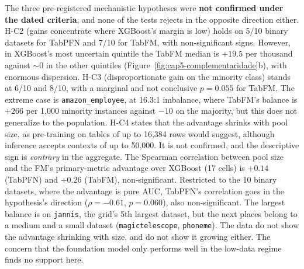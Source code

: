 The three pre-registered mechanistic hypotheses were \textbf{not
confirmed under the
dated criteria}, and none of the tests rejects in the opposite direction
either. H-C2 (gains concentrate where XGBoost's margin is low) holds
on 5/10 binary datasets for TabPFN and 7/10 for TabFM, with
non-significant signs. However, in XGBoost's most uncertain quintile
the TabFM median is $+19.5$ per thousand against ${\sim}0$ in the
other quintiles (Figure~\ref{fig:cap5-complementaridade}b), with
enormous dispersion. H-C3 (disproportionate gain on the minority
class) stands at 6/10 and 8/10, with a marginal and not conclusive $p = 0.055$ for TabFM. The extreme case is
\texttt{amazon\_\allowbreak employee}, at 16.3:1 imbalance, where
TabFM's balance is $+266$ per 1{,}000 minority instances against $-10$
on the majority, but this does not generalize to the
population. H-C4 states that the advantage shrinks with pool size, as
pre-training on tables of up to 16{,}384 rows would suggest, although
inference accepts contexts of up to 50{,}000. It is not confirmed, and
the descriptive sign is \emph{contrary} in the aggregate. The Spearman
correlation between pool size and the FM's
primary-metric advantage over XGBoost (17 cells) is $+0.14$ (TabPFN)
and $+0.26$ (TabFM), non-significant. Restricted to the 10 binary
datasets, where the advantage is pure AUC, TabPFN's correlation goes
in the hypothesis's direction ($\rho=-0.61$, $p=0.060$), also non-significant. The
largest balance is on \texttt{jannis}, the grid's 5th largest
dataset, but the next places belong to a medium and a small dataset
(\texttt{magictelescope}, \texttt{phoneme}). The data do not show the advantage shrinking with size, and do not show it growing either.
The concern that the foundation model only performs well in the
low-data regime finds no support here.

